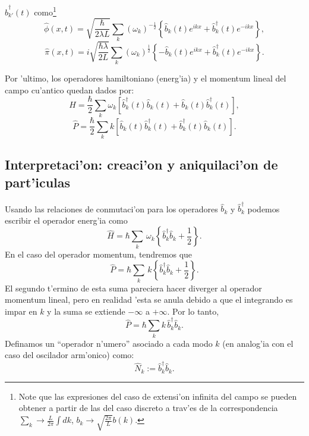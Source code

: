 $\hat{b}_{k'}^\dagger (t) $ como\footnote{Note que las expresiones del caso de
extensi'on infinita del campo se pueden obtener a partir de las del caso
discreto a trav'es de la correspondencia $\sum_k  \rightarrow 
\frac{L}{2\pi}\int dk$, $b_k\rightarrow \sqrt{\frac{2\pi}{L}}b(k)$.}
\begin{equation}
\hat{\phi}(x,t) =\sqrt{\frac{\hbar}{2\lambda L}}\sum_k\left( \omega_k\right)
^{-\frac
{1}{2}}\left\{ \hat{b}_k(t) e^{ikx}+\hat{b}_k^{\dagger
}(t) e^{-ikx}\right\},\label{qOperador32}
\end{equation}
\begin{equation}
\hat{\pi}(x,t) =i\sqrt{\frac{\hbar\lambda}{2L}}\sum_k\left( \omega_k\right)
^{\frac
{1}{2}}\left\{ -\hat{b}_k(t) e^{ikx}+\hat{b}_k^{\dagger
}(t) e^{-ikx}\right\} .\label{piOperador32}
\end{equation}

 Por 'ultimo, los operadores hamiltoniano (energ'ia) y el momentum lineal del
campo cu'antico quedan dados por:
\begin{equation}
\hat{H}=\frac{\hbar}{2}\sum_k\omega_k\left[ \hat{b}_k^\dagger (t)
\hat{b}_k(t) +\hat{b}_k(t)\hat{b}_k^\dagger (t)  \right]  ,
\end{equation}
\begin{equation}
\hat{P}=\frac{\hbar}{2}\sum_k k\left[ \hat{b}_k(t) \hat{b}_k^\dagger (t)
+\hat{b}_k^\dagger (t)\hat{b}_k(t) \right]  .
\end{equation}


\subsection{Interpretaci'on: creaci'on y aniquilaci'on de
part'iculas}\label{secints}

Usando las relaciones de conmutaci'on para los operadores $\hat{b}_k$ y
$\hat{b}_k^\dagger $ podemos escribir el operador energ'ia como
\begin{equation}
\hat{H}  = \hbar\sum_k\,\omega_k\left\{ \hat{b}_k^\dagger  \hat{b}_k
+\frac{1}{2} \right\}.
\end{equation}
En el caso del operador momentum, tendremos que
\begin{equation}
\hat{P}  = \hbar\sum_k\, k\left\{ \hat{b}_k^\dagger  \hat{b}_k +\frac{1}{2}
\right\} .
\end{equation}
El segundo t'ermino de esta suma pareciera hacer diverger al operador momentum
lineal, pero en realidad 'esta se anula debido a que el integrando es impar en
$k$ y la suma se extiende $-\infty $ a $+\infty$. Por lo tanto,
\begin{equation}
\hat{P}=\hbar\sum_k k\, \hat{b}_k^\dagger  \hat{b}_k .
\end{equation}
Definamos un ``operador n'umero'' asociado a cada modo $k$ (en analog'ia con el
caso del oscilador arm'onico) como:
\begin{equation}
\hat{N}_k:=\hat{b}_k^\dagger \hat{b}_k .\label{defN}
\end{equation}

